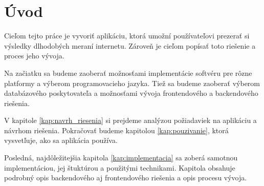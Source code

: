 \chapter*{Úvod} %

Cieľom tejto práce je vyvoriť aplikáciu, ktorá umožní používateľovi prezerať si výsledky dlhodobých meraní internetu.
Zároveň je cieľom popísať toto riešenie a proces jeho vývoja.

Na začiatku sa budeme zaoberať možnosťami implementácie softvéru pre rôzne platformy a výberom programovacieho jazyka. 
Tiež sa budeme zaoberať výberom databázového poskytovateľa a možnosťami vývoja frontendového a backendového riešenia.

V kapitole \ref{kap:navrh_riesenia} si prejdeme analýzou požiadaviek na aplikáciu a návrhom riešenia. Pokračovať budeme kapitolou \ref{kap:pouzivanie},
ktorá vysvetľuje, ako sa aplikácia používa.

Posledná, najdôležitejšia kapitola \ref{kap:implementacia} sa zoberá samotnou implementáciou, jej štuktúrou a použitými technikami.
Kapitola obsahuje podrobný opis backendového aj frontendového riešenia a opis procesu vývoja.
